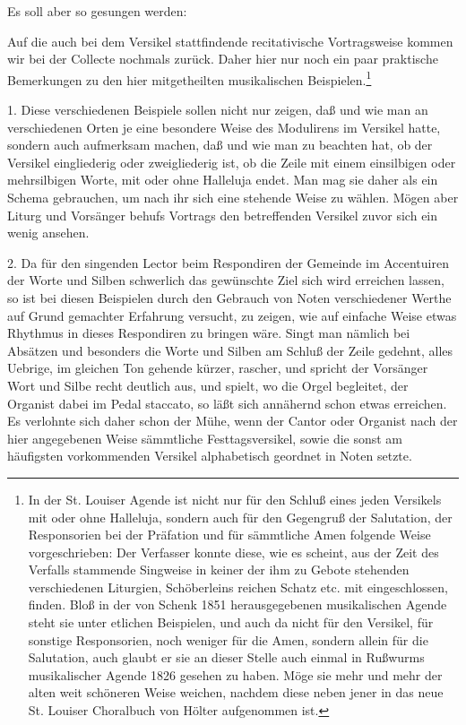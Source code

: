 Es soll aber so gesungen werden:


Auf die auch bei dem Versikel stattfindende recitativische Vortragsweise kommen wir bei der Collecte nochmals zurück. Daher hier nur noch ein paar praktische Bemerkungen zu den hier mitgetheilten musikalischen Beispielen.\footnote{In der St. Louiser Agende ist nicht nur für den Schluß eines jeden Versikels mit oder ohne Halleluja, sondern auch für den Gegengruß der Salutation, der Responsorien bei der Präfation und für sämmtliche Amen folgende Weise vorgeschrieben:
Der Verfasser konnte diese, wie es scheint, aus der Zeit des Verfalls stammende Singweise in keiner der ihm zu Gebote stehenden verschiedenen Liturgien, Schöberleins reichen Schatz etc. mit eingeschlossen, finden. Bloß in der von Schenk 1851 herausgegebenen musikalischen Agende steht sie unter etlichen Beispielen, und auch da nicht für den Versikel, für sonstige Responsorien, noch weniger für die Amen, sondern allein für die Salutation, auch glaubt er sie an dieser Stelle auch einmal in Rußwurms musikalischer Agende 1826 gesehen zu haben. Möge sie mehr und mehr der alten weit schöneren Weise weichen, nachdem diese neben jener in das neue St. Louiser Choralbuch von Hölter aufgenommen ist.}

1. Diese verschiedenen Beispiele sollen nicht nur zeigen, daß und wie man an verschiedenen Orten je eine besondere Weise des Modulirens im Versikel hatte, sondern auch aufmerksam machen, daß und wie man zu beachten hat, ob der Versikel eingliederig oder zweigliederig ist, ob die Zeile mit einem einsilbigen oder mehrsilbigen Worte, mit oder ohne Halleluja endet. Man mag sie daher als ein Schema gebrauchen, um nach ihr sich eine stehende Weise zu wählen. Mögen aber Liturg und Vorsänger behufs Vortrags den betreffenden Versikel zuvor sich ein wenig ansehen.

2. Da für den singenden Lector beim Respondiren der Gemeinde im Accentuiren der Worte und Silben schwerlich das gewünschte Ziel sich wird erreichen lassen, so ist bei diesen Beispielen durch den Gebrauch von Noten verschiedener Werthe auf Grund gemachter Erfahrung versucht, zu zeigen, wie auf einfache Weise etwas Rhythmus in dieses Respondiren zu bringen wäre. Singt man nämlich bei Absätzen und besonders die Worte und Silben am Schluß der Zeile gedehnt, alles Uebrige, im gleichen Ton gehende kürzer, rascher, und spricht der Vorsänger Wort und Silbe recht deutlich aus, und spielt, wo die Orgel begleitet, der Organist dabei im Pedal staccato, so läßt sich annähernd schon etwas erreichen. Es verlohnte sich daher schon der Mühe, wenn der Cantor oder Organist nach der hier angegebenen Weise sämmtliche Festtagsversikel, sowie die sonst am häufigsten vorkommenden Versikel alphabetisch geordnet in Noten setzte.


